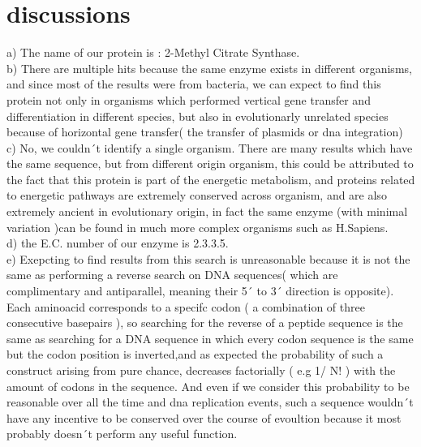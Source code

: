 \documentclass[a4paper,english,12pt,bibliography=totoc]{scrreprt}
\begin{document}


\section{discussions}

a) The name of our protein is : 2-Methyl Citrate Synthase.\\

b) There are multiple hits because the same enzyme exists in different organisms, and since most of the results were from bacteria, we can expect to find this protein not only in organisms which performed vertical gene transfer and differentiation in different species, but also in evolutionarly unrelated species because of horizontal gene transfer( the transfer of plasmids or dna integration)\\

c) No, we couldn´t identify a single organism. There are many results which have the same sequence, but from different origin organism, this could be attributed to the fact that this protein is part of the energetic metabolism, and proteins related to energetic pathways are extremely conserved across organism, and are also extremely ancient in evolutionary origin, in fact the same enzyme (with minimal variation )can be found in much more complex organisms such as H.Sapiens. \\

d) the E.C. number of our enzyme is 2.3.3.5.\\

e) Exepcting to find results from this search is unreasonable because it is not the same as performing a reverse search on DNA sequences( which are complimentary and antiparallel, meaning their 5´ to 3´ direction is opposite). Each aminoacid corresponds to a specifc codon ( a combination of three consecutive basepairs ), so searching for the reverse of a peptide sequence is the same as searching for a DNA sequence in which every codon sequence is the same but the codon position is inverted,and as expected the probability of such a construct arising from pure chance, decreases factorially ( e.g 1/ N! ) with the amount of codons in the sequence.
And even if we consider this probability to be reasonable over all the time and dna replication events, such a sequence wouldn´t have any incentive to be conserved over the course of evoultion because it most probably doesn´t perform any useful function. \\
\end{document}
